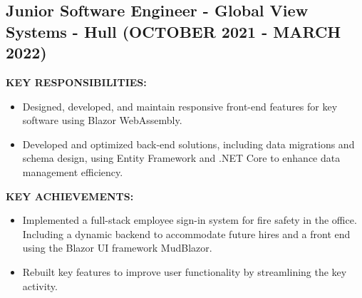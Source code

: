 \documentclass{article}
\begin{document}
\subsection{Junior Software Engineer - \textnormal{Global View Systems - Hull} \footnotesize{(OCTOBER 2021 - MARCH 2022)}}
\noindent
\begin{minipage}[t]{0.48\textwidth}
    \footnotesize{\textbf{KEY RESPONSIBILITIES:}}
    \normalsize{}
    \begin{itemize}[leftmargin=*]
        \item Designed, developed, and maintain responsive front-end features for key software using Blazor WebAssembly.
        \item Developed and optimized back-end solutions, including data migrations and schema design, using Entity Framework and .NET Core to enhance data management efficiency.
    \end{itemize}
\end{minipage}
\hfill
\begin{minipage}[t]{0.48\textwidth}
    \footnotesize{\textbf{KEY ACHIEVEMENTS:}}
    \normalsize{}
    \begin{itemize}[leftmargin=*]
        \item Implemented a full-stack employee sign-in system for fire safety in the office. Including a dynamic backend to accommodate future hires and a front end using the Blazor UI framework MudBlazor.
        \item Rebuilt key features to improve user functionality by streamlining the key activity. 
    \end{itemize}
\end{minipage}
\end{document}
